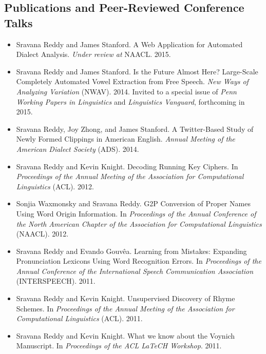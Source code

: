 \documentclass{res}
\begin{document}
\begin{resume}
\section{Publications and Peer-Reviewed Conference Talks}

\begin{itemize}[noitemsep]
\item Sravana Reddy and James Stanford. A Web Application for Automated Dialect Analysis. {\em Under review at} NAACL. 2015.

\item Sravana Reddy and James Stanford. Is the Future Almost Here? Large-Scale Completely Automated Vowel Extraction from Free Speech. {\em New Ways of Analyzing Variation} (NWAV). 2014. 
Invited to a special issue of {\em Penn Working Papers in Linguistics} and {\em Linguistics Vanguard}, forthcoming in 2015. 

\item Sravana Reddy, Joy Zhong, and James Stanford. A Twitter-Based Study of Newly Formed Clippings in American English. {\em Annual Meeting of the American Dialect Society} (ADS). 2014.

\item Sravana Reddy and Kevin Knight. Decoding Running Key Ciphers. In {\itshape Proceedings of the Annual Meeting of the Association for Computational Linguistics} (ACL). 2012.

\item Sonjia Waxmonsky and Sravana Reddy. G2P Conversion of Proper Names Using Word Origin Information. In {\itshape Proceedings of the Annual Conference of the North American Chapter of the Association for Computational Linguistics} (NAACL). 2012.

\item Sravana Reddy and Evando Gouv\^ea. Learning from Mistakes: Expanding Pronunciation Lexicons Using Word Recognition Errors. In {\itshape Proceedings of the Annual Conference of the International Speech Communication Association} (INTERSPEECH). 2011.

\item Sravana Reddy and Kevin Knight. Unsupervised Discovery of Rhyme Schemes. In {\itshape Proceedings of the Annual Meeting of the Association for Computational Linguistics} (ACL). 2011.

\item Sravana Reddy and Kevin Knight. What we know about the Voynich Manuscript. In {\itshape Proceedings of the ACL LaTeCH Workshop}. 2011.


\end{itemize}
\end{resume}
\end{document}
